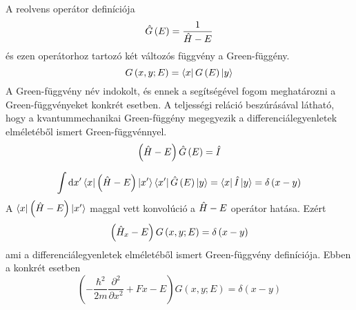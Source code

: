A reolvens operátor definíciója
\begin{equation}
    \hat{G}\left( E \right) = \frac{1}{\hat{H} - E}
\end{equation}
és ezen operátorhoz tartozó két változós függvény a Green-függény.
\begin{equation}
    G\left( x, y; E \right) = \Bra{x}G\left(E\right)\Ket{y}
\end{equation}
A Green-függvény név indokolt, és ennek a segítségével fogom meghatározni a Green-függvényeket konkrét esetben. A teljességi reláció beszúrásával látható, hogy a kvantummechanikai Green-függény megegyezik a differenciálegyenletek elméletéből ismert Green-függvénnyel.
\begin{equation}
    \left(\hat{H} - E\right) \hat{G}\left( E \right) = \hat{I}
\end{equation}

\begin{equation}
    \int \mathrm{d}x^\prime \Bra{x}\left(\hat{H} - E\right) \Ket{x^\prime}\Bra{x^\prime} \hat{G}\left( E \right)\Ket{y} = \Bra{x}\hat{I}\Ket{y} = \delta \left(x - y\right)
\end{equation} 
A $\Bra{x}\left(\hat{H} - E\right) \Ket{x^\prime}$ maggal vett konvolúció a $\hat{H} - E$ operátor hatása. Ezért
\begin{equation}
    \left(\hat{H}_x - E\right) G\left(x, y; E\right) = \delta\left(x - y\right)
\end{equation}
ami a differenciálegyenletek elméletéből ismert Green-függvény definíciója. Ebben a konkrét esetben
\begin{equation}
    \left( -\frac{\hbar^2}{2m}\frac{\partial^2}{\partial x^2} + Fx - E \right) G\left(x, y; E\right) = \delta\left(x - y\right)
	\label{green:deltaeq}
\end{equation}
